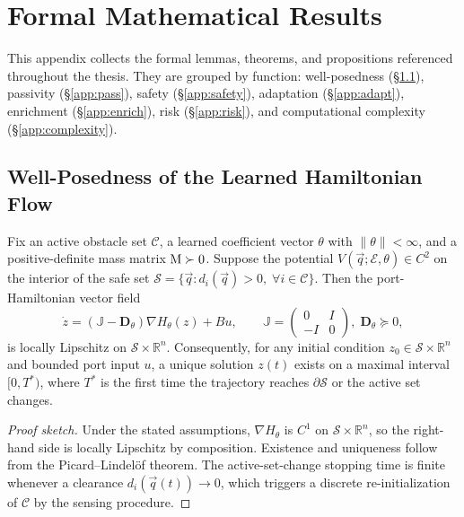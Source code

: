 
\chapter{Formal Mathematical Results}
\label{app:theorems}

This appendix collects the formal lemmas, theorems, and propositions
referenced throughout the thesis.
They are grouped by function: well-posedness (§\ref{app:wp}),
passivity (§\ref{app:pass}), safety (§\ref{app:safety}),
adaptation (§\ref{app:adapt}), enrichment (§\ref{app:enrich}),
risk (§\ref{app:risk}), and computational complexity
(§\ref{app:complexity}).

\section{Well-Posedness of the Learned Hamiltonian Flow}
\label{app:wp}

\begin{lemma}
\label{app:lem:wellposed}
Fix an active obstacle set $\mathcal{C}$, a learned coefficient
vector $\theta$ with $\|\theta\|<\infty$, and a positive-definite
mass matrix $\mathrm{M}\succ 0$.
Suppose the potential $V(\vec{q};\mathcal{E},\theta)\in C^2$ on the
interior of the safe set
$\mathcal{S}=\{\vec{q}: d_i(\vec{q})>0,\;\forall i\in\mathcal{C}\}$.
Then the port-Hamiltonian vector field
\[
  \dot{z} = (\mathbb{J} - \mathbf{D}_\theta)\nabla H_\theta(z) + B u,
  \qquad
  \mathbb{J} = \begin{pmatrix}0&I\\-I&0\end{pmatrix},\;
  \mathbf{D}_\theta \succeq 0,
\]
is locally Lipschitz on $\mathcal{S}\times\mathbb{R}^n$.
Consequently, for any initial condition $z_0\in\mathcal{S}
\times\mathbb{R}^n$ and bounded port input $u$, a unique solution
$z(t)$ exists on a maximal interval $[0,T^*)$, where $T^*$ is the
first time the trajectory reaches $\partial\mathcal{S}$ or the
active set changes.
\end{lemma}

\begin{proof}[Proof sketch]
Under the stated assumptions, $\nabla H_\theta$ is $C^1$ on
$\mathcal{S}\times\mathbb{R}^n$, so the right-hand side is locally
Lipschitz by composition.
Existence and uniqueness follow from the Picard–Lindelöf theorem.
The active-set-change stopping time is finite whenever a clearance
$d_i(\vec{q}(t))\to 0$, which triggers a discrete re-initialization
of $\mathcal{C}$ by the sensing procedure.
\end{proof}

